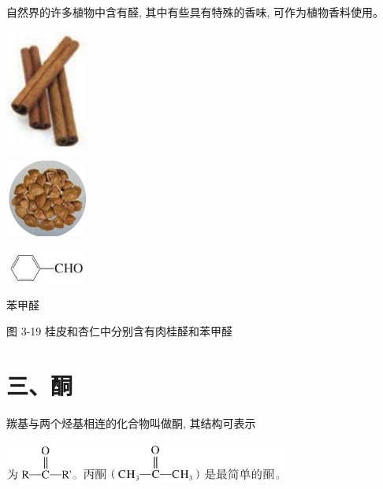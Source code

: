 \documentclass[10pt]{article}
\begin{document}
自然界的许多植物中含有醛, 其中有些具有特殊的香味, 可作为植物香料使用。

\begin{center}
\includegraphics[max width=0.2\textwidth]{images/0190efc5-b58a-7c43-bfb0-e0a030df9cfd_76_501531.jpg}
\end{center}

\begin{center}
\includegraphics[max width=0.2\textwidth]{images/0190efc5-b58a-7c43-bfb0-e0a030df9cfd_76_949839.jpg}
\end{center}

\begin{center}
\includegraphics[max width=0.2\textwidth]{images/0190efc5-b58a-7c43-bfb0-e0a030df9cfd_76_441309.jpg}
\end{center}

苯甲醛

图 3-19 桂皮和杏仁中分别含有肉桂醛和苯甲醛

\section*{三、酮}

羰基与两个烃基相连的化合物叫做酮, 其结构可表示

\begin{center}
\includegraphics[max width=0.7\textwidth]{images/0190efc5-b58a-7c43-bfb0-e0a030df9cfd_76_733379.jpg}
\end{center}
\end{document}
